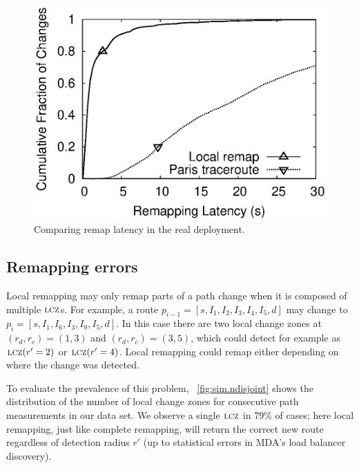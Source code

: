 \begin{figure}
\begin{minipage}{0.33\textwidth}
\includegraphics[width=1.05\textwidth]{figs/latencies.eps}
\caption{Comparing remap latency in the real deployment.}
\label{fig:deploy.latency}
\end{minipage}
\end{figure}

\subsection{Remapping errors}
\label{sec:remap.errors}

Local remapping may only remap parts of a path change when it is
composed of multiple $\mathrm{\textsc{lcz}}$s.  For example, a route
$p_{i-1} = [s, I_1, I_2, I_3, I_4, I_5, d]$ may change to $p_i =[s, I_1, I_6, I_3, I_9, I_5, d]$.  
In this case there are two local change zones at $(r_d,r_c)=(1,3)$ and $(r_d,r_c)=(3,5)$,
which  \dtrack{} could detect for example as $\mathrm{\textsc{lcz}}(r'=2)$ or $\mathrm{\textsc{lcz}}(r'=4)$. 
Local remapping could remap either depending on where the change was detected.



To evaluate the prevalence of this problem,
\figstr~\ref{fig:sim.ndisjoint} shows the distribution of the number of
local change zones for consecutive path measurements in our data
set.\footnotemark{}  We observe a single $\mathrm{\textsc{lcz}}$ in 79\% of cases; here
local remapping, just like complete remapping, will return the correct
new route regardless of detection radius $r'$ (up to statistical errors
in MDA's load balancer discovery).

